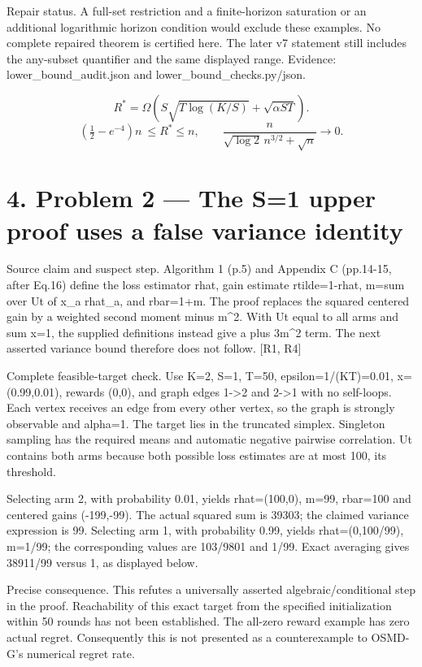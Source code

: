 \documentclass[10pt]{article}
\begin{document}
Repair status. A full-set restriction and a finite-horizon saturation or an additional logarithmic horizon condition would exclude these examples. No complete repaired theorem is certified here. The later v7 statement still includes the any-subset quantifier and the same displayed range. Evidence: lower\_bound\_audit.json and lower\_bound\_checks.py/json.\par
\[R^*=\Omega\!\left(S\sqrt{T\log(K/\allowbreak{}S)}+\sqrt{\alpha ST}\right).\] \[\left(\tfrac12-e^{-4}\right)n\ \le R^*\le n,\qquad \frac{n}{\sqrt{\log2}\,n^{3/\allowbreak{}2}+\sqrt n}\longrightarrow0.\]\par
\section*{4. Problem 2 — The S=1 upper proof uses a false variance identity}
Source claim and suspect step. Algorithm 1 (p.5) and Appendix C (pp.14-15, after Eq.16) define the loss estimator rhat, gain estimate rtilde=1-rhat, m=sum over Ut of x\_a rhat\_a, and rbar=1+m. The proof replaces the squared centered gain by a weighted second moment minus m\textasciicircum{}2. With Ut equal to all arms and sum x=1, the supplied definitions instead give a plus 3m\textasciicircum{}2 term. The next asserted variance bound therefore does not follow. [R1, R4]\par
Complete feasible-target check. Use K=2, S=1, T=50, epsilon=1/(KT)=0.01, x=(0.99,0.01), rewards (0,0), and graph edges 1->2 and 2->1 with no self-loops. Each vertex receives an edge from every other vertex, so the graph is strongly observable and alpha=1. The target lies in the truncated simplex. Singleton sampling has the required means and automatic negative pairwise correlation. Ut contains both arms because both possible loss estimates are at most 100, its threshold.\par
Selecting arm 2, with probability 0.01, yields rhat=(100,0), m=99, rbar=100 and centered gains (-199,-99). The actual squared sum is 39303; the claimed variance expression is 99. Selecting arm 1, with probability 0.99, yields rhat=(0,100/99), m=1/99; the corresponding values are 103/9801 and 1/99. Exact averaging gives 38911/99 versus 1, as displayed below.\par
Precise consequence. This refutes a universally asserted algebraic/conditional step in the proof. Reachability of this exact target from the specified initialization within 50 rounds has not been established. The all-zero reward example has zero actual regret. Consequently this is not presented as a counterexample to OSMD-G’s numerical regret rate.\par
\end{document}
